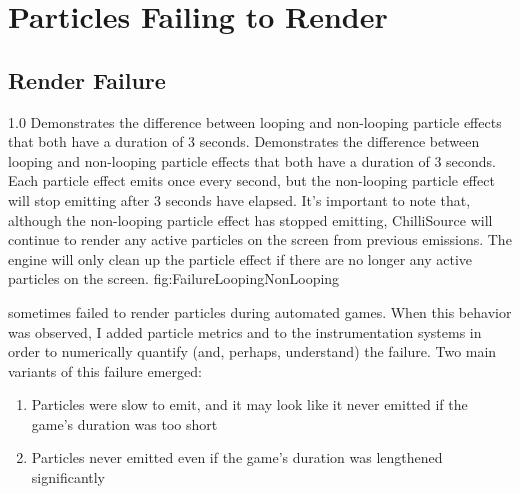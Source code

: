 \section{Particles Failing to Render}\label{sec:observe_emit_failure}

\subsection{Render Failure}\label{ssec:observe_emit_failure_failure}

{1.0}
{Demonstrates the difference between looping and non-looping particle effects that both have a duration of 3 seconds.}
{Demonstrates the difference between looping and non-looping particle effects that both have a duration of 3 seconds. Each particle effect emits once every second, but the non-looping particle effect will stop emitting after 3 seconds have elapsed. It's important to note that, although the non-looping particle effect has stopped emitting, ChilliSource will continue to render any active particles on the screen from previous emissions. The engine will only clean up the particle effect if there are no longer any active particles on the screen.}
{fig:FailureLoopingNonLooping}

 sometimes failed to render particles during automated games. When this behavior was observed, I added particle metrics  and  to the instrumentation systems in order to numerically quantify (and, perhaps, understand) the failure. Two main variants of this failure emerged:

\begin{enumerate}[nolistsep,topsep=0pt]
	\item Particles were slow to emit, and it may look like it never emitted if the game's duration was too short
	\item Particles never emitted even if the game's duration was lengthened significantly
\end{enumerate}

